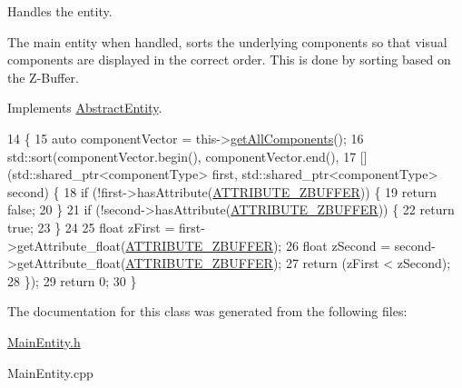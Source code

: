 Handles the entity. 

The main entity when handled, sorts the underlying components so that visual components are displayed in the correct order. This is done by sorting based on the Z-\/\-Buffer. 

Implements \hyperlink{class_abstract_entity_af14b173190f84093b5498d3c0139e71f}{Abstract\-Entity}.


\begin{DoxyCode}
14                        \{
15     \textcolor{keyword}{auto} componentVector = this->\hyperlink{class_abstract_entity_af67659713b7d451168d53206c1d71de7}{getAllComponents}();
16     std::sort(componentVector.begin(), componentVector.end(),
17         [] (std::shared\_ptr<componentType> first, std::shared\_ptr<componentType> second) \{
18             \textcolor{keywordflow}{if} (!first->hasAttribute(\hyperlink{_a_e___attributes_8h_af11539bb711833d6321aaccd369e9e4b}{ATTRIBUTE\_ZBUFFER})) \{
19                 \textcolor{keywordflow}{return} \textcolor{keyword}{false};
20             \}
21             \textcolor{keywordflow}{if} (!second->hasAttribute(\hyperlink{_a_e___attributes_8h_af11539bb711833d6321aaccd369e9e4b}{ATTRIBUTE\_ZBUFFER})) \{
22                 \textcolor{keywordflow}{return} \textcolor{keyword}{true};
23             \}
24 
25             \textcolor{keywordtype}{float} zFirst = first->getAttribute\_float(\hyperlink{_a_e___attributes_8h_af11539bb711833d6321aaccd369e9e4b}{ATTRIBUTE\_ZBUFFER});
26             \textcolor{keywordtype}{float} zSecond = second->getAttribute\_float(\hyperlink{_a_e___attributes_8h_af11539bb711833d6321aaccd369e9e4b}{ATTRIBUTE\_ZBUFFER});
27             \textcolor{keywordflow}{return} (zFirst < zSecond);
28     \});
29     \textcolor{keywordflow}{return} 0;
30 \}\end{DoxyCode}


The documentation for this class was generated from the following files\-:\begin{DoxyCompactItemize}
\item 
\hyperlink{_main_entity_8h}{Main\-Entity.\-h}\item 
Main\-Entity.\-cpp\end{DoxyCompactItemize}
